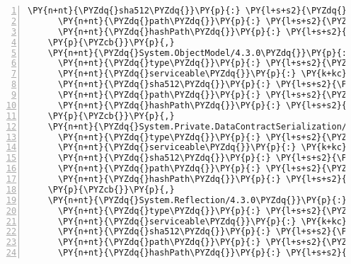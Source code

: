 \begin{Verbatim}[commandchars=\\\{\},numbers=left,firstnumber=1,stepnumber=1,numberblanklines=0]
      \PY{n+nt}{\PYZdq{}sha512\PYZdq{}}\PY{p}{:} \PY{l+s+s2}{\PYZdq{}sha512\PYZhy{}PN2tzosAzdHTfP3MF8N9N6lgRdB1Q/V1h4SAAUy8NXlZW403DRWs1GzJD6NSyHKSKaTpejLhERxWN3yKG+tnPA==\PYZdq{}}\PY{p}{,}
      \PY{n+nt}{\PYZdq{}path\PYZdq{}}\PY{p}{:} \PY{l+s+s2}{\PYZdq{}system.numerics.vectors/4.5.0\PYZhy{}rc1\PYZdq{}}\PY{p}{,}
      \PY{n+nt}{\PYZdq{}hashPath\PYZdq{}}\PY{p}{:} \PY{l+s+s2}{\PYZdq{}system.numerics.vectors.4.5.0\PYZhy{}rc1.nupkg.sha512\PYZdq{}}
    \PY{p}{\PYZcb{}}\PY{p}{,}
    \PY{n+nt}{\PYZdq{}System.ObjectModel/4.3.0\PYZdq{}}\PY{p}{:} \PY{p}{\PYZob{}}
      \PY{n+nt}{\PYZdq{}type\PYZdq{}}\PY{p}{:} \PY{l+s+s2}{\PYZdq{}package\PYZdq{}}\PY{p}{,}
      \PY{n+nt}{\PYZdq{}serviceable\PYZdq{}}\PY{p}{:} \PY{k+kc}{true}\PY{p}{,}
      \PY{n+nt}{\PYZdq{}sha512\PYZdq{}}\PY{p}{:} \PY{l+s+s2}{\PYZdq{}sha512\PYZhy{}bdX+80eKv9bN6K4N+d77OankKHGn6CH711a6fcOpMQu2Fckp/Ft4L/kW9WznHpyR0NRAvJutzOMHNNlBGvxQzQ==\PYZdq{}}\PY{p}{,}
      \PY{n+nt}{\PYZdq{}path\PYZdq{}}\PY{p}{:} \PY{l+s+s2}{\PYZdq{}system.objectmodel/4.3.0\PYZdq{}}\PY{p}{,}
      \PY{n+nt}{\PYZdq{}hashPath\PYZdq{}}\PY{p}{:} \PY{l+s+s2}{\PYZdq{}system.objectmodel.4.3.0.nupkg.sha512\PYZdq{}}
    \PY{p}{\PYZcb{}}\PY{p}{,}
    \PY{n+nt}{\PYZdq{}System.Private.DataContractSerialization/4.3.0\PYZdq{}}\PY{p}{:} \PY{p}{\PYZob{}}
      \PY{n+nt}{\PYZdq{}type\PYZdq{}}\PY{p}{:} \PY{l+s+s2}{\PYZdq{}package\PYZdq{}}\PY{p}{,}
      \PY{n+nt}{\PYZdq{}serviceable\PYZdq{}}\PY{p}{:} \PY{k+kc}{true}\PY{p}{,}
      \PY{n+nt}{\PYZdq{}sha512\PYZdq{}}\PY{p}{:} \PY{l+s+s2}{\PYZdq{}sha512\PYZhy{}yDaJ2x3mMmjdZEDB4IbezSnCsnjQ4BxinKhRAaP6kEgL6Bb6jANWphs5SzyD8imqeC/3FxgsuXT6ykkiH1uUmA==\PYZdq{}}\PY{p}{,}
      \PY{n+nt}{\PYZdq{}path\PYZdq{}}\PY{p}{:} \PY{l+s+s2}{\PYZdq{}system.private.datacontractserialization/4.3.0\PYZdq{}}\PY{p}{,}
      \PY{n+nt}{\PYZdq{}hashPath\PYZdq{}}\PY{p}{:} \PY{l+s+s2}{\PYZdq{}system.private.datacontractserialization.4.3.0.nupkg.sha512\PYZdq{}}
    \PY{p}{\PYZcb{}}\PY{p}{,}
    \PY{n+nt}{\PYZdq{}System.Reflection/4.3.0\PYZdq{}}\PY{p}{:} \PY{p}{\PYZob{}}
      \PY{n+nt}{\PYZdq{}type\PYZdq{}}\PY{p}{:} \PY{l+s+s2}{\PYZdq{}package\PYZdq{}}\PY{p}{,}
      \PY{n+nt}{\PYZdq{}serviceable\PYZdq{}}\PY{p}{:} \PY{k+kc}{true}\PY{p}{,}
      \PY{n+nt}{\PYZdq{}sha512\PYZdq{}}\PY{p}{:} \PY{l+s+s2}{\PYZdq{}sha512\PYZhy{}KMiAFoW7MfJGa9nDFNcfu+FpEdiHpWgTcS2HdMpDvt9saK3y/G4GwprPyzqjFH9NTaGPQeWNHU+iDlDILj96aQ==\PYZdq{}}\PY{p}{,}
      \PY{n+nt}{\PYZdq{}path\PYZdq{}}\PY{p}{:} \PY{l+s+s2}{\PYZdq{}system.reflection/4.3.0\PYZdq{}}\PY{p}{,}
      \PY{n+nt}{\PYZdq{}hashPath\PYZdq{}}\PY{p}{:} \PY{l+s+s2}{\PYZdq{}system.reflection.4.3.0.nupkg.sha512\PYZdq{}}

\end{Verbatim}

